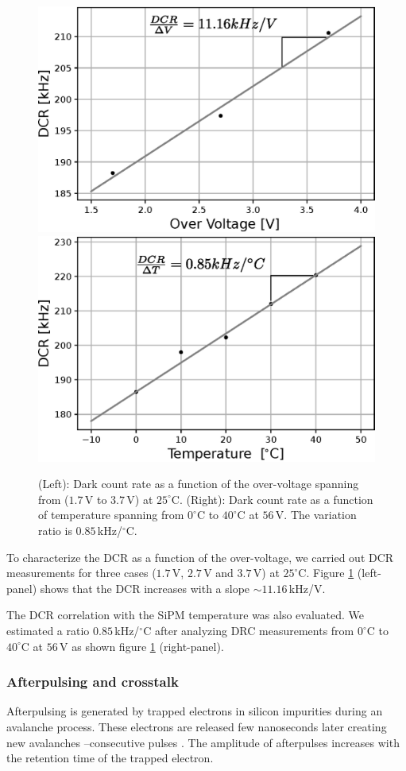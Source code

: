 \documentclass[a4paper,11pt]{article}
\begin{document}
\begin{figure}[htbp]
\centering 
\includegraphics[width=.48\textwidth]{Figures/DCR_vs_ov_1350CS.eps}
\quad
\includegraphics[width=.48\textwidth]{Figures/DCR_T_1350CS.eps}
\caption{\label{fig:DCRover} (Left): Dark count rate as a function of the over-voltage spanning from ($1.7$\,V to $3.7$\,V) at $25^{\circ}$C. (Right): Dark count rate as a function of temperature spanning from $0^{\circ}$C to $40^{\circ}$C at $56$\,V. The variation ratio is $0.85$\,kHz/$^{\circ}$C.}
\end{figure}

To characterize the DCR as a function of the over-voltage, we carried out DCR measurements for three cases ($1.7$\,V, $2.7$\,V and $3.7$\,V) at $25^{\circ}$C. Figure \ref{fig:DCRover} (left-panel) shows that the DCR increases with a slope $\sim11.16$\,kHz/V. 

The DCR correlation with the SiPM temperature was also evaluated. We estimated a ratio $0.85$\,kHz/$^{\circ}$C after analyzing DRC measurements from $0^{\circ}$C to $40^{\circ}$C at $56$\,V as shown figure \ref{fig:DCRover} (right-panel).


\subsubsection{Afterpulsing and crosstalk}

Afterpulsing is generated by trapped electrons in silicon impurities during an avalanche process. These electrons are released few nanoseconds later creating new avalanches --consecutive pulses \cite{Xu2017}. The amplitude of afterpulses increases with the retention time of the trapped electron. 
\end{document}
